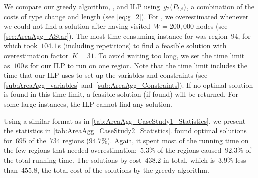 We compare our greedy algorithm, \Astar, and ILP
using~$g_2(P_{t,i})$,
a combination of the costs 
of type change and length (see \eq\ref{eq:g_2}).
For \Astar, we overestimated 
whenever we could not find a solution after 
having visited~$W=200{,}000$ nodes 
(see \sect\ref{sec:AreaAgg_AStar}).
The most time-consuming instance for \Astar was region~$94$,
for which \Astar took~$104.1\,$s (including repetitions)
to find a feasible solution 
with overestimation factor~$K=31$.
To avoid waiting too long,
we set the time limit as~$100\,$s 
for our ILP to run on one region.
Note that the time limit includes
the time that our ILP uses 
to set up the variables and constraints
(see \sects\ref{sub:AreaAgg_variables} 
and~\ref{sub:AreaAgg_Constraints}).
If no optimal solution is found in this time limit,
a feasible solution (if found) will be returned.
For some large instances, 
the ILP cannot find any solution.

Using a similar format as in 
\tab\ref{tab:AreaAgg_CaseStudy1_Statistics},
we present the statistics in 
\tab\ref{tab:AreaAgg_CaseStudy2_Statistics}.
\Astar found optimal solutions 
for~$695$ of the~$734$ regions ($94.7\%$).
Again, it spent most of the running time 
on the few regions that needed 
overestimation:~$5.3\%$ of the regions 
caused~$92.3\%$ of the total running time.
The solutions by \Astar cost~$438.2$ in total, 
which is~$3.9\%$ less than~$455.8$, 
the total cost of the solutions by the greedy algorithm.

